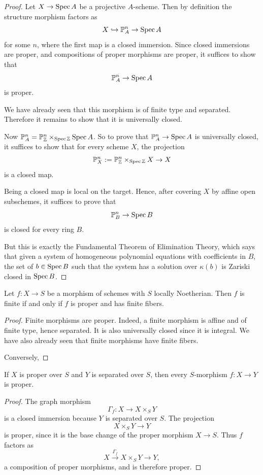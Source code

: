 \documentclass[12pt]{article}
\begin{document}
\begin{proof}
    Let $X \to \operatorname{Spec} A$ be a projective $A$-scheme. Then by definition the structure morphism factors as
    \[
        X \hookrightarrow \mathbb P^n_A \to \operatorname{Spec} A
    \]
    for some $n$, where the first map is a closed immersion. Since closed immersions are proper, and compositions of proper morphisms are proper, it suffices to show that
    \[
        \mathbb P^n_A \to \operatorname{Spec} A
    \]
    is proper.

    We have already seen that this morphism is of finite type and separated. Therefore it remains to show that it is universally closed.

    Now $\mathbb P^n_A = \mathbb P^n_{\mathbb Z} \times_{\operatorname{Spec} \mathbb Z} \operatorname{Spec} A$. So to prove that \(\mathbb P^n_A \to \operatorname{Spec} A\) is universally closed, it suffices to show that for every scheme $X$, the projection
    \[
        \mathbb P^n_X := \mathbb P^n_{\mathbb Z} \times_{\operatorname{Spec} \mathbb Z} X \to X
    \]
    is a closed map.

    Being a closed map is local on the target. Hence, after covering $X$ by affine open subschemes, it suffices to prove that
    \[
        \mathbb P^n_B \to \operatorname{Spec} B
    \]
    is closed for every ring $B$.

    But this is exactly the Fundamental Theorem of Elimination Theory, which says that given a system of homogeneous polynomial equations with coefficients in $B$, the set of $b\in \operatorname{Spec} B$ such that the system has a solution over $\kappa(b)$ is Zariski closed in $\operatorname{Spec} B$.
\end{proof}

\begin{proposition}
    Let $f:X\to S$ be a morphism of schemes with $S$ locally Noetherian. Then $f$ is finite if and only if $f$ is proper and has finite fibers.
\end{proposition}

\begin{proof}
    Finite morphisms are proper. Indeed, a finite morphism is affine and of finite type, hence separated. It is also universally closed since it is integral. We have also already seen that finite morphisms have finite fibers.

    Conversely,
\end{proof}


\begin{proposition}
    If $X$ is proper over $S$ and $Y$ is separated over $S$, then every $S$-morphism $f:X\to Y$ is proper.
\end{proposition}
\begin{proof}
    The graph morphism
    \[
        \Gamma_f:X\to X\times_S Y
    \]
    is a closed immersion because $Y$ is separated over $S$. The projection
    \[
        X\times_S Y\to Y
    \]
    is proper, since it is the base change of the proper morphism $X\to S$. Thus $f$ factors as
    \[
        X\xrightarrow{\Gamma_f}X\times_S Y\to Y,
    \]
    a composition of proper morphisms, and is therefore proper.
\end{proof}
\end{document}
